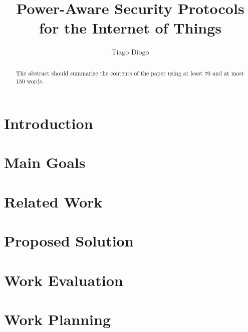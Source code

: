 \documentclass{llncs}
\begin{document}
\setcounter{secnumdepth}{3}

\title{Power-Aware Security Protocols for the Internet of Things}
%
\titlerunning{}  %
%
\author{Tiago Diogo}
%
%
%

\maketitle              %

\begin{abstract}
The abstract should summarize the contents of the paper
using at least 70 and at most 150 words.
\keywords{}
\end{abstract}

\section{Introduction}


\section{Main Goals}


\section{Related Work}


\section{Proposed Solution}


\section{Work Evaluation}


\section{Work Planning}

\end{document}
